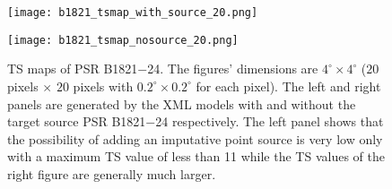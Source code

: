 \documentclass[a4paper, 12pt]{report}
\begin{document}
      \begin{table}[!htp]
        \centering
          \caption[Fit parameters of the spectra model of PSR B1821$-$24.]
            {Fit parameters of the spectra model of PSR B1821$-$24. 
            The names of parameters are also consistent with Equation
            \ref{eq: fermi_model}.}
            
          \label{table: b1821_fit_result}        
      \end{table}  
      \vspace{1cm}
          
      \begin{figure}[!ht]
        \begin{center}
        \begin{minipage}{0.46\textwidth}
          \begin{center} 
            \texttt{[image: b1821\_tsmap\_with\_source\_20.png]}
          \end{center}
        \end{minipage}
        \begin{minipage}{0.45\textwidth}
          \begin{center}
            \texttt{[image: b1821\_tsmap\_nosource\_20.png]}
          \end{center}
        \end{minipage}
      \end{center}
        \caption[TS maps of PSR B1821$-$24.]
        {TS maps of PSR B1821$-$24. The figures' dimensions are $4^{\circ} \times4^{\circ}$ 
        ($20$ pixels $\times$ $20$ pixels with $0.2^{\circ} \times 0.2^{\circ}$ for each pixel). 
        The left and right panels are generated by the XML models with and without the 
        target source PSR B1821$-$24 respectively. The left panel shows that the possibility 
        of adding an imputative point source is very low only with a maximum TS value of 
        less than 11 while the TS values of the right figure are generally much larger.}
          \label{fig: b1821_tsmap_comparison_20}
      \end{figure}
      \vspace{1cm}
            
\end{document}
